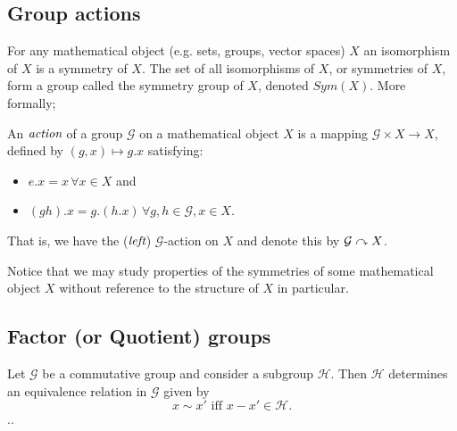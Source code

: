 \subsection{Group actions} %
\label{subsec:groupaction}

For any mathematical object (e.g. sets, groups, vector spaces) $X$ an isomorphism
of $X$ is a symmetry of $X$. The set of all isomorphisms of $X$, or symmetries
of $X$, form a group called the symmetry group of $X$, denoted $Sym(X)$.
More formally;

\begin{defn}
	An $\emph{action}$ of a group $\mathcal{G}$ on a mathematical object $X$ is
	a mapping $\mathcal{G} \times X \to X$, defined by $(g,x) \mapsto g . x$
	satisfying:
	\begin{itemize}
			\item $e . x = x \, \forall x \in X$ and
			\item $(g h) . x = g . (h . x) \, \forall g,h \in \mathcal{G}, x \in X$.
	\end{itemize}
	That is, we have the ($\emph{left}$) $\mathcal{G}$-action on $X$ and denote this
	by $\mathcal{G} \curvearrowright X$.
\end{defn}

Notice that we may study properties of the symmetries of some mathematical object $X$
without reference to the structure of $X$ in particular.









\subsection{Factor (or Quotient) groups} %
\label{subsec:factorgroups}
Let $\mathcal{G}$ be a commutative group and consider a subgroup $\mathcal{H}$.
Then $\mathcal{H}$ determines an equivalence relation in $\mathcal{G}$ given by
\[
	x \sim x' \mbox{ iff } x - x' \in \mathcal{H}.
\]
..

